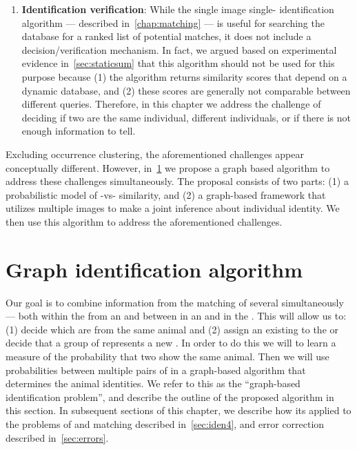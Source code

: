 \begin{enumerate}
        \item \textbf{Identification verification}:
            While the single image single-\annot{} identification algorithm
              --- described in~\cref{chap:matching} --- is useful for searching
              the database for a ranked list of potential matches, it does not
              include a decision/verification mechanism.
            In fact, we argued based on experimental evidence
              in~\cref{sec:staticsum} that this algorithm should not be used for
              this purpose because
            (1) the algorithm returns similarity scores that depend on a
              dynamic database, and
            (2) these scores are generally not comparable between different
              queries.
            Therefore, in this chapter we address the challenge of deciding if
              two \annots{} are the same individual, different individuals, or
              if there is not enough information to tell.
    \end{enumerate}

    Excluding occurrence clustering, the aforementioned challenges appear
      conceptually different.
    However, in~\cref{sec:geniden} we propose a graph based algorithm to
      address these challenges simultaneously.
    The proposal consists of two parts:
    (1) a probabilistic model of \annot{}-vs-\annot{} similarity, and
    (2) a graph-based framework that utilizes multiple images to make a joint
      inference about individual identity.
    We then use this algorithm to address the aforementioned challenges.

\section{Graph identification algorithm}\label{sec:geniden}

    Our goal is to combine information from the matching of several \annots{}
      simultaneously --- both within the \annots{} from an \occurrence{} and
      between \annots{} in an \occurrence{} and \annots{} in the
      \masterdatabase{}.
    This will allow us to:
    (1) decide which \annots{} are from the same animal and
    (2) assign an existing \name{} to the \annots{} or decide that a group of
      \annots{} represents a new \name{}.
    In order to do this we will to learn a measure of the probability that two
      \annots{} show the same animal.
    Then we will use probabilities between multiple pairs of \annots{} in a
      graph-based algorithm that determines the animal identities.
    We refer to this as the ``graph-based identification problem'', and
      describe the outline of the proposed algorithm in this section.
    In subsequent sections of this chapter, we describe how its applied to the
      problems of \intraoccurrence{} and \vsexemplar{} matching described
      in~\cref{sec:iden4}, and error correction described in~\cref{sec:errors}.

